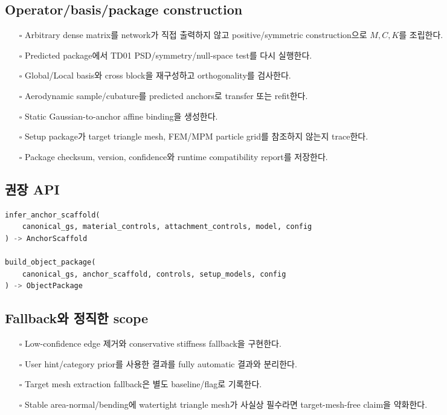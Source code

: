 \documentclass[10pt,a4paper]{article}
\newcommand{\todo}{\textcolor{TodoGray}{\(\square\)}}
\begin{document}
\subsection*{Operator/basis/package construction}

\begin{itemize}
  \item[\todo] Arbitrary dense matrix를 network가 직접 출력하지 않고 positive/symmetric construction으로 \(M,C,K\)를 조립한다.
  \item[\todo] Predicted package에서 TD01 PSD/symmetry/null-space test를 다시 실행한다.
  \item[\todo] Global/Local basis와 cross block을 재구성하고 orthogonality를 검사한다.
  \item[\todo] Aerodynamic sample/cubature를 predicted anchors로 transfer 또는 refit한다.
  \item[\todo] Static Gaussian-to-anchor affine binding을 생성한다.
  \item[\todo] Setup package가 target triangle mesh, FEM/MPM particle grid를 참조하지 않는지 trace한다.
  \item[\todo] Package checksum, version, confidence와 runtime compatibility report를 저장한다.
\end{itemize}

\subsection*{권장 API}

\begin{lstlisting}[language=Python]
infer_anchor_scaffold(
    canonical_gs, material_controls, attachment_controls, model, config
) -> AnchorScaffold

build_object_package(
    canonical_gs, anchor_scaffold, controls, setup_models, config
) -> ObjectPackage
\end{lstlisting}

\subsection*{Fallback와 정직한 scope}

\begin{itemize}
  \item[\todo] Low-confidence edge 제거와 conservative stiffness fallback을 구현한다.
  \item[\todo] User hint/category prior를 사용한 결과를 fully automatic 결과와 분리한다.
  \item[\todo] Target mesh extraction fallback은 별도 baseline/flag로 기록한다.
  \item[\todo] Stable area-normal/bending에 watertight triangle mesh가 사실상 필수라면 target-mesh-free claim을 약화한다.
\end{itemize}
\end{document}
